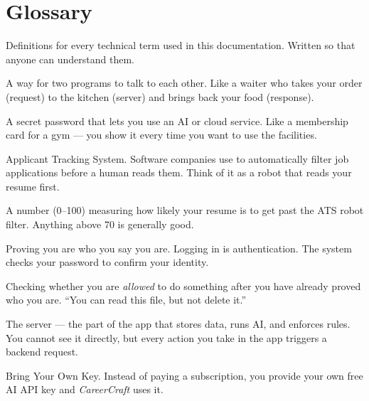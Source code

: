\documentclass[12pt, a4paper]{report}
\newcommand{\cc}{\textit{CareerCraft}}
\begin{document}
\chapter{Glossary}

Definitions for every technical term used in this documentation.
Written so that anyone can understand them.

\begin{description}[style=nextline, leftmargin=3cm, labelwidth=2.8cm, font=\bfseries\color{ccpurple}]

\item[API]
A way for two programs to talk to each other.
Like a waiter who takes your order (request) to the kitchen (server) and brings back your food (response).

\item[API Key]
A secret password that lets you use an AI or cloud service.
Like a membership card for a gym --- you show it every time you want to use the facilities.

\item[ATS]
Applicant Tracking System.  Software companies use to automatically filter job applications before a human reads them.
Think of it as a robot that reads your resume first.

\item[ATS Score]
A number (0--100) measuring how likely your resume is to get past the ATS robot filter.
Anything above 70 is generally good.

\item[Authentication]
Proving you are who you say you are.  Logging in is authentication.
The system checks your password to confirm your identity.

\item[Authorization]
Checking whether you are \emph{allowed} to do something after you have already proved who you are.
``You can read this file, but not delete it.''

\item[Backend]
The server --- the part of the app that stores data, runs AI, and enforces rules.
You cannot see it directly, but every action you take in the app triggers a backend request.

\item[BYOK]
Bring Your Own Key.
Instead of paying a subscription, you provide your own free AI API key and \cc{} uses it.


\end{description}
\end{document}
